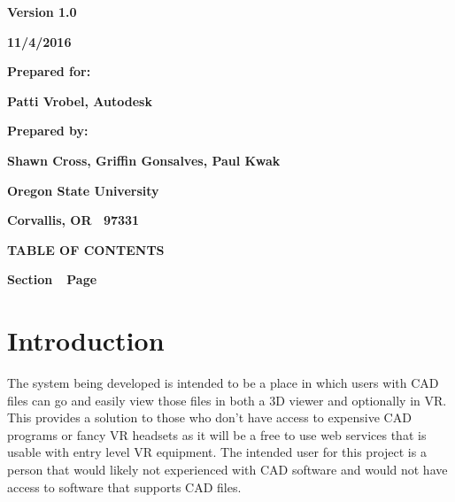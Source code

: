 \documentclass[letterpaper, 10pt, draftclsnofoot, compsoc, onecolumn]{IEEEtran}
\begin{document}
\bigskip
\bigskip
\bigskip

\begin{figure}
\centering
\end{figure}

\bigskip
\bigskip

{\centering{}\bfseries\color{black}
Version 1.0
\par}

{\centering{}\bfseries\color{black}
11/4/2016
\par}


\bigskip
\bigskip

{\centering{}\bfseries\color{black}
Prepared for:
\par}

{\centering{}\bfseries\color{black}
Patti Vrobel, Autodesk
\par}


\bigskip
\bigskip

{\centering{}\bfseries\color{black}
Prepared by:  
\par}

{\centering{}\bfseries\color{black}
Shawn Cross, Griffin Gonsalves, Paul Kwak
\par}

{\centering{}\bfseries\color{black}
Oregon State University
\par}

{\centering{}\bfseries\color{black}
Corvallis, OR \ 97331
\par}


{\centering{}\bfseries\color{black}
TABLE OF CONTENTS
\par}

\bigskip

{\bfseries\color{black}
Section\ \ Page}

\setcounter{tocdepth}{9}
\renewcommand\contentsname{}
\tableofcontents

\bigskip
\clearpage

\section{Introduction}
	The system being developed is intended to be a place in which users with CAD files can go and easily view those files 
	in both a 3D viewer and optionally in VR. This provides a solution to those who don't have access to expensive CAD 
	programs or fancy VR headsets as it will be a free to use web services that is usable with entry level VR equipment. 
	The intended user for this project is a person that would likely not experienced with CAD software and would not have 
	access to software that supports CAD files.  
\end{document}
